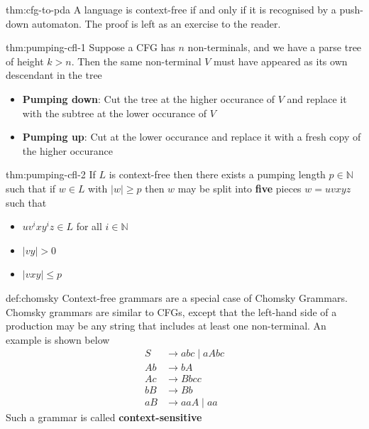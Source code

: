 \documentclass[landscape, 8pt]{extarticle}
\begin{document}
\begin{multicols}{3}
\begin{thm}{thm:cfg-to-pda}{}
A language is context-free if and only if it is recognised by a push-down automaton. The proof is left as an exercise to the reader.
\end{thm}

\begin{thm}{thm:pumping-cfl-1}{}
Suppose a CFG has $n$ non-terminals, and we have a parse tree of height $k>n$. Then the same non-terminal $V$ must have appeared as its own descendant in the tree
\renewcommand\labelitemi{\tiny$\bullet$}
\begin{itemize}
    \setlength\itemsep{0em}
    \item \textbf{Pumping down}: Cut the tree at the higher occurance of $V$ and replace it with the subtree at the lower occurance of $V$
    \item \textbf{Pumping up}: Cut at the lower occurance and replace it with a fresh copy of the higher occurance
\end{itemize}
\end{thm}

\begin{thm}{thm:pumping-cfl-2}{}
If $L$ is context-free then there exists a pumping length $p\in\mathbb{N}$ such that if $w\in L$ with $\lvert w\rvert \ge p$ then $w$ may be split into \textbf{five} pieces $w = uvxyz$ such that
\renewcommand\labelitemi{\tiny$\bullet$}
\begin{itemize}
    \setlength\itemsep{0em}
    \item $uv^{i}xy^{i}z\in L$ for all $i\in \mathbb{N}$ 
    \item $\lvert vy\rvert > 0$
    \item $\lvert vxy\rvert \le p$
\end{itemize}
\end{thm}

\begin{dfn}{def:chomsky}{}
Context-free grammars are a special case of Chomsky Grammars. Chomsky grammars are similar to CFGs, except that the left-hand side of a production may be any string that includes at least one non-terminal. An example is shown below
\begin{align*}
    S &\to abc \mid aAbc \\
    Ab &\to bA \\
    Ac &\to Bbcc \\
    bB &\to Bb \\
    aB &\to aaA \mid aa
\end{align*}
Such a grammar is called \textbf{context-sensitive}
\end{dfn}


\end{multicols}
\end{document}
